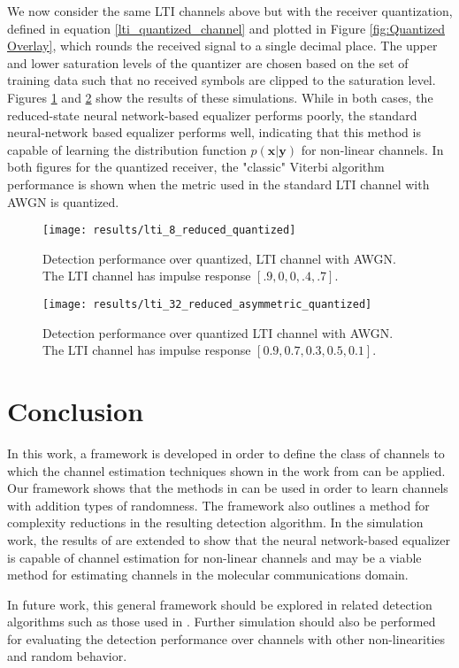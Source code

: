 \par
We now consider the same LTI channels above but with the receiver quantization, defined in equation \eqref{lti_quantized_channel} and plotted in Figure \ref{fig:Quantized Overlay}, which rounds the received signal to a single decimal place. The upper and lower saturation levels of the quantizer are chosen based on the set of training data such that no received symbols are clipped to the saturation level.
Figures \ref{fig:LTI performance quantized reduced} and \ref{fig:LTI performance quantized} show the results of these simulations. While in both cases, the reduced-state neural network-based equalizer performs poorly, the standard neural-network based equalizer performs well, indicating that this method is capable of learning the distribution function $p(\mathbf{x}|\mathbf{y})$ for non-linear channels. In both figures for the quantized receiver, the "classic" Viterbi algorithm performance is shown when the metric used in the standard LTI channel with AWGN is quantized.

\begin{figure}[htp]
	\texttt{[image: results/lti\_8\_reduced\_quantized]}
		  \caption{Detection performance over quantized, LTI channel with AWGN. The LTI channel has impulse response  $[.9, 0, 0, .4, .7]$. }
	  \label{fig:LTI performance quantized reduced}
\end{figure}

\begin{figure}[H]
	\texttt{[image: results/lti\_32\_reduced\_asymmetric\_quantized]}
		  \caption{Detection performance over quantized LTI channel with AWGN.  The LTI channel has impulse response  $[0.9, 0.7, 0.3, 0.5, 0.1]$.}
	  \label{fig:LTI performance quantized}
\end{figure}



\section{Conclusion}
In this work, a framework is developed in order to define the class of channels to which the channel estimation techniques shown in the work from \cite{shlezinger2019viterbinet} can be applied. Our framework shows that the methods in \cite{shlezinger2019viterbinet} can be used in order to learn channels with addition types of randomness. The framework also outlines a method for complexity reductions in the resulting detection algorithm. 
 In the simulation work, the results of \cite{shlezinger2019viterbinet} are extended to show that the neural network-based equalizer is capable of channel estimation for  non-linear channels and may be a viable method for estimating channels in the molecular communications domain. 
 \par 
 In future work, this general framework should be explored in related detection algorithms such as those used in \cite{shlezinger2020datadriven}. Further simulation should also be performed for evaluating the detection performance over channels with other non-linearities and random behavior. 

